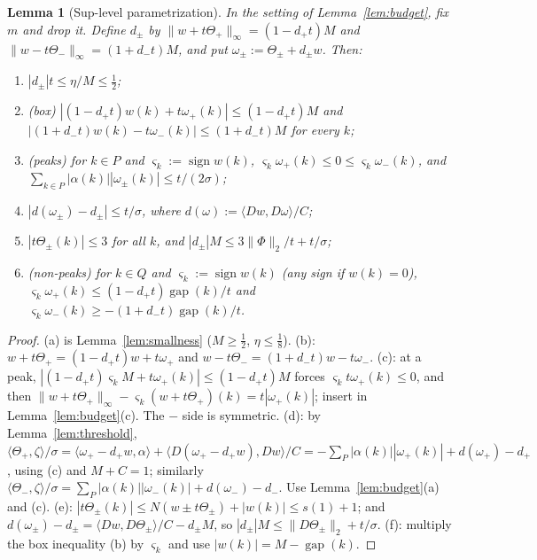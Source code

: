 \documentclass[10pt]{amsart}
\newtheorem{lemma}[theorem]{Lemma}
\theoremstyle{definition}
\theoremstyle{remark}
\newcommand{\sgn}{\operatorname{sign}}
\newcommand{\gap}{\operatorname{gap}}
\newcommand{\ip}[2]{\langle #1,#2\rangle}
\begin{document}
\begin{lemma}[Sup-level parametrization]\label{lem:suplevel}
In the setting of Lemma~\ref{lem:budget}, fix $m$ and drop it.  Define
$d_\pm$ by $\|w+t\Theta_+\|_\infty=(1-d_+t)M$ and $\|w-t\Theta_-\|_\infty=
(1+d_-t)M$, and put $\omega_\pm:=\Theta_\pm+d_\pm w$.  Then:
\begin{enumerate}
\item[(a)] $|d_\pm|t\le\eta/M\le\frac12$;
\item[(b)] \textup{(box)} $|(1-d_+t)w(k)+t\omega_+(k)|\le(1-d_+t)M$ and
$|(1+d_-t)w(k)-t\omega_-(k)|\le(1+d_-t)M$ for every $k$;
\item[(c)] \textup{(peaks)} for $k\in P$ and $\varsigma_k:=\sgn w(k)$,
$\varsigma_k\omega_+(k)\le0\le\varsigma_k\omega_-(k)$, and
$\sum_{k\in P}|\alpha(k)||\omega_\pm(k)|\le t/(2\sigma)$;
\item[(d)] $|d(\omega_\pm)-d_\pm|\le t/\sigma$, where
$d(\omega):=\ip{Dw}{D\omega}/C$;
\item[(e)] $|t\Theta_\pm(k)|\le3$ for all $k$, and $|d_\pm|M\le3\|\Phi\|_2/t+
t/\sigma$;
\item[(f)] \textup{(non-peaks)} for $k\in Q$ and $\varsigma_k:=\sgn w(k)$ (any
sign if $w(k)=0$), $\varsigma_k\omega_+(k)\le(1-d_+t)\gap(k)/t$ and
$\varsigma_k\omega_-(k)\ge-(1+d_-t)\gap(k)/t$.
\end{enumerate}
\end{lemma}

\begin{proof}
(a) is Lemma~\ref{lem:smallness} ($M\ge\frac12$, $\eta\le\frac18$).  (b):
$w+t\Theta_+=(1-d_+t)w+t\omega_+$ and $w-t\Theta_-=(1+d_-t)w-t\omega_-$.
(c): at a peak, $|(1-d_+t)\varsigma_kM+t\omega_+(k)|\le(1-d_+t)M$ forces
$\varsigma_kt\omega_+(k)\le0$, and then $\|w+t\Theta_+\|_\infty-\varsigma_k
(w+t\Theta_+)(k)=t|\omega_+(k)|$; insert in Lemma~\ref{lem:budget}(c).  The
$-$ side is symmetric.  (d): by Lemma~\ref{lem:threshold},
$\ip{\Theta_+}{\zeta}/\sigma=\ip{\omega_+-d_+w}{\alpha}+\ip{D(\omega_+-d_+w)}
{Dw}/C=-\sum_P|\alpha(k)||\omega_+(k)|+d(\omega_+)-d_+$, using (c) and
$M+C=1$; similarly $\ip{\Theta_-}{\zeta}/\sigma=\sum_P|\alpha(k)||
\omega_-(k)|+d(\omega_-)-d_-$.  Use Lemma~\ref{lem:budget}(a) and (c).
(e): $|t\Theta_\pm(k)|\le N(w\pm t\Theta_\pm)+|w(k)|\le s(1)+1$; and
$d(\omega_\pm)-d_\pm=\ip{Dw}{D\Theta_\pm}/C-d_\pm M$, so $|d_\pm|M\le
\|D\Theta_\pm\|_2+t/\sigma$.  (f): multiply the box inequality (b) by
$\varsigma_k$ and use $|w(k)|=M-\gap(k)$.
\end{proof}
\end{document}
